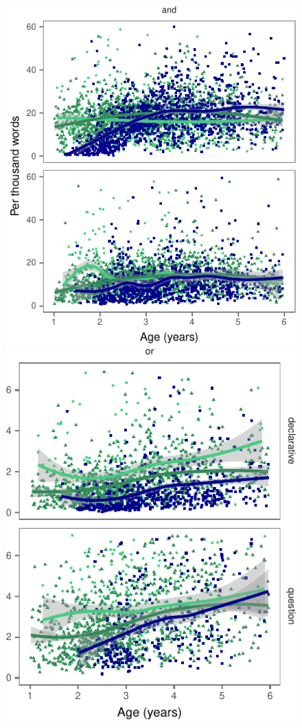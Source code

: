 \documentclass[10pt, letterpaper]{article}
\newenvironment{CodeChunk}{}{}
\begin{document}
\begin{CodeChunk}
\begin{figure}[t]

{\centering \includegraphics{figs/byspeechActPlots-1} \includegraphics{figs/byspeechActPlots-2} 

}
\end{figure}
\end{CodeChunk}
\end{document}
